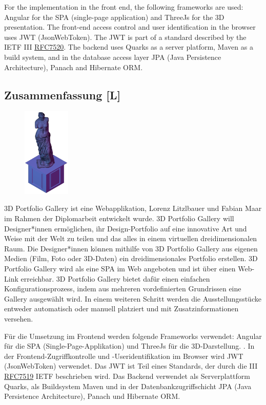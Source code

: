 For the implementation in the front end, the following frameworks are used: Angular for the SPA (single-page application) and ThreeJs for the 3D presentation. The front-end access control and user identification in the browser uses JWT (JsonWebToken). The JWT is part of a standard described by the IETF III \href{https://www.rfc-editor.org/ rfc/rFc7519}{RFC7520}.
The backend uses Quarks as a server platform, Maven as a build system, and in the database access layer JPA (Java Persistence Architecture), Panach and Hibernate ORM.
\newpage
\begin{spacing}{1}
    \chapter*{Zusammenfassung [L]}
\end{spacing}
\begin{figure}
    \begin{center}
      \includegraphics[width=0.2\textwidth]{pics/statue.png}
    \end{center}
\end{figure}
3D Portfolio Gallery ist eine Webapplikation, Lorenz Litzlbauer und Fabian Maar im Rahmen der Diplomarbeit entwickelt wurde. 3D Portfolio Gallery will Designer*innen ermöglichen, ihr Design-Portfolio auf eine innovative Art und Weise mit der Welt zu teilen und das alles in einem virtuellen dreidimensionalen Raum. Die Designer*innen können mithilfe von 3D Portfolio Gallery aus eigenen Medien (Film, Foto oder 3D-Daten) ein dreidimensionales Portfolio erstellen.
3D Portfolio Gallery wird als eine SPA im Web angeboten und ist über einen Web-Link erreichbar.
3D Portfolio Gallery bietet dafür einen einfachen Konfigurationsprozess, indem aus mehreren vordefinierten Grundrissen eine Gallery ausgewählt wird. In einem weiteren Schritt werden die Ausstellungsstücke entweder automatisch oder manuell platziert und mit Zusatzinformationen versehen.


Für die Umsetzung im Frontend werden folgende Frameworks verwendet: Angular für die SPA (Single-Page-Applikation) und ThreeJs für die 3D-Darstellung. . In der Frontend-Zugriffkontrolle und -Useridentifikation im Browser wird JWT (JsonWebToken) verwendet. Das JWT ist Teil eines Standards, der durch die III \href{https://www.rfc-editor.org/rfc/rfc7519}{RFC7519} IETF beschrieben wird.
Das Backend verwendet als Serverplattform Quarks, als Buildsystem Maven und in der Datenbankzugriffschicht JPA (Java Persistence Architecture), Panach und Hibernate ORM.
